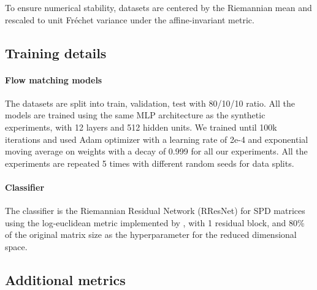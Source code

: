 \documentclass[10pt]{article} %
\theoremstyle{plain}
\theoremstyle{definition}
\theoremstyle{remark}
\begin{document}
To ensure numerical stability, datasets are centered by the Riemannian mean and rescaled to unit Fréchet variance under the affine-invariant metric.

\subsection{Training details}
\label{appendix:real_training_details}

\paragraph{Flow matching models} The datasets are split into train, validation, test with 80/10/10 ratio. All the models are trained using the same MLP architecture as the synthetic experiments, with 12 layers and 512 hidden units. We trained until 100k iterations and used Adam optimizer with a learning rate of 2e-4 and exponential moving average on weights with a decay of 0.999 for all our experiments. All the experiments are repeated 5 times with different random seeds for data splits.

\paragraph{Classifier}

The classifier is the Riemannian Residual Network (RResNet) for SPD matrices using the log-euclidean metric \citet{katsman2023riemannianresnet} implemented by \citet{cov_logeucresnet_pelletier2025}, with 1 residual block, and 80\% of the original matrix size as the hyperparameter for the reduced dimensional space.


\subsection{Additional metrics}

\end{document}
